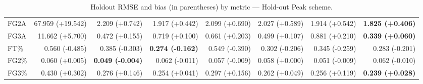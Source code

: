 \documentclass{article}
\begin{document}
\begin{table}[H]
{\begin{tabular}{lrrrrrrr}
FG2A & 67.959 (+19.542) & 2.209 (+0.742) & 1.917 (+0.442) & 2.099 (+0.690) & 2.027 (+0.589) & 1.914 (+0.542) & \textbf{1.825 (+0.406)} \\
FG3A & 11.662 (+5.700) & 0.472 (+0.155) & 0.719 (+0.100) & 0.661 (+0.203) & 0.499 (+0.107) & 0.881 (+0.210) & \textbf{0.339 (+0.060)} \\
FT\% & 0.560 (-0.485) & 0.385 (-0.303) & \textbf{0.274 (-0.162)} & 0.549 (-0.390) & 0.302 (-0.206) & 0.345 (-0.259) & 0.283 (-0.201) \\
FG2\% & 0.060 (+0.005) & \textbf{0.049 (-0.004)} & 0.062 (-0.011) & 0.057 (-0.009) & 0.058 (+0.000) & 0.051 (-0.009) & 0.062 (-0.010) \\
FG3\% & 0.430 (+0.302) & 0.276 (+0.146) & 0.254 (+0.041) & 0.297 (+0.156) & 0.262 (+0.049) & 0.256 (+0.119) & \textbf{0.239 (+0.028)} \\
\bottomrule
\end{tabular}
}
\caption{Holdout RMSE and bias (in parentheses) by metric — Hold-out Peak scheme.}
\label{tab:coverage_holdout_peak}
\end{table}
\end{document}
